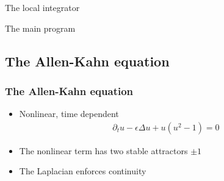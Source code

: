\begin{frame}
  \begin{block}{The local integrator}
    
  \end{block}
\end{frame}

\begin{frame}
  \begin{block}{The main program}
    
  \end{block}
\end{frame}

\subsection[Allen-Kahn]{The Allen-Kahn equation}
\frame{\tableofcontents[currentsection,subsectionstyle=show/shaded/hide]}

\begin{frame}
  \frametitle{The Allen-Kahn equation}
  \begin{itemize}
  \item Nonlinear, time dependent
    \begin{gather*}
      \partial_t u -\epsilon\Delta u + u (u^2-1) = 0
    \end{gather*}
  \item The nonlinear term has two stable attractors $\pm 1$
  \item The Laplacian enforces continuity 
  \end{itemize}
\end{frame}



